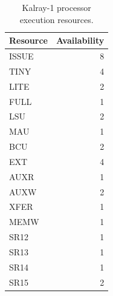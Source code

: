 \begin{table}
\begin{center}
\begin{tabular}{|l|r|} \hline
Resource	& Availability \\ \hline
ISSUE	& 8	\\
TINY	& 4	\\
LITE	& 2	\\
FULL	& 1	\\
LSU	& 2	\\
MAU	& 1	\\
BCU	& 2	\\
EXT	& 4	\\
AUXR	& 1	\\
AUXW	& 2	\\
XFER	& 1	\\
MEMW	& 1	\\
SR12	& 1	\\
SR13	& 1	\\
SR14	& 1	\\
SR15	& 2	\\
\hline \end{tabular}
\end{center}
\label{table:resources}
\caption{Kalray-1 processor execution resources.}
\end{table}
